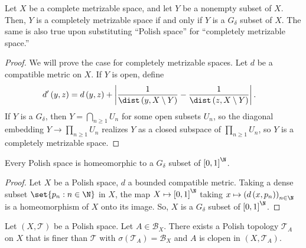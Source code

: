 \documentclass[10pt]{mypackage}
\begin{document}
\begin{proposition}
  Let $X$ be a complete metrizable space, and let $Y$ be a nonempty subset of $X$. Then, $Y$ is a completely metrizable space if and only if $Y$ is a $G_{\delta}$ subset of $X$. The same is also true upon substituting ``Polish space'' for ``completely metrizable space.''
\end{proposition}
\begin{proof}
  We will prove the case for completely metrizable spaces. Let $d$ be a compatible metric on $X$. If $Y$ is open, define
  \begin{align*}
    d'\left( y,z \right) &= d\left( y,z \right) + \left\vert \frac{1}{\dist\left( y,X\setminus Y \right)} - \frac{1}{\dist\left( z,X\setminus Y \right)} \right\vert.
  \end{align*}
  If $Y$ is a $G_{\delta}$, then $Y = \bigcap_{n\geq 1}U_n$ for some open subsets $U_n$, so the diagonal embedding $Y\to \prod_{n\geq 1}U_n$ realizes $Y$ as a closed subspace of $\prod_{n\geq 1}U_n$, so $Y$ is a completely metrizable space.
\end{proof}
\begin{proposition}
  Every Polish space is homeomorphic to a $G_{\delta}$ subset of $\left[ 0,1 \right]^{\N}$.
\end{proposition}
\begin{proof}
  Let $X$ be a Polish space, $d$ a bounded compatible metric. Taking a dense subset $\set{p_n : n\in \N}$ in $X$, the map $X\mapsto \left[ 0,1 \right]^{\N}$ taking $x\mapsto \left( d\left( x,p_n \right) \right)_{n\in \N}$ is a homeomorphism of $X$ onto its image. So, $X$ is a $G_{\delta}$ subset of $\left[ 0,1 \right]^{\N}$.
\end{proof}
\begin{theorem}
  Let $\left( X,\mathcal{T} \right)$ be a Polish space. Let $A\in \mathcal{B}_X$. There exists a Polish topology $\mathcal{T}_A$ on $X$ that is finer than $\mathcal{T}$ with $\sigma\left( \mathcal{T}_A \right) = \mathcal{B}_X$ and $A$ is clopen in $\left( X,\mathcal{T}_A \right)$.
\end{theorem}
\end{document}
